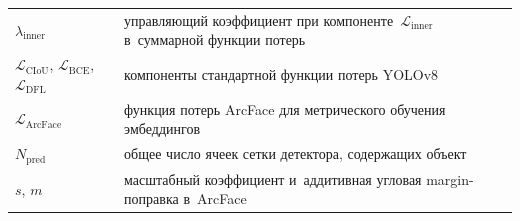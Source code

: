 \begin{longtable}{@{}p{}p{}@{}}
$\lambda_{\text{inner}}$ & управляющий коэффициент при компоненте~$\mathcal{L}_{\text{inner}}$ в~суммарной функции потерь\\
$\mathcal{L}_{\text{CIoU}}$, $\mathcal{L}_{\text{BCE}}$, $\mathcal{L}_{\text{DFL}}$ & компоненты стандартной функции потерь YOLOv8\\
$\mathcal{L}_{\text{ArcFace}}$ & функция потерь ArcFace для метрического обучения эмбеддингов\\
$N_{\text{pred}}$ & общее число ячеек сетки детектора, содержащих объект\\
$s$, $m$ & масштабный коэффициент и~аддитивная угловая margin-поправка в~ArcFace\\
\end{longtable}
